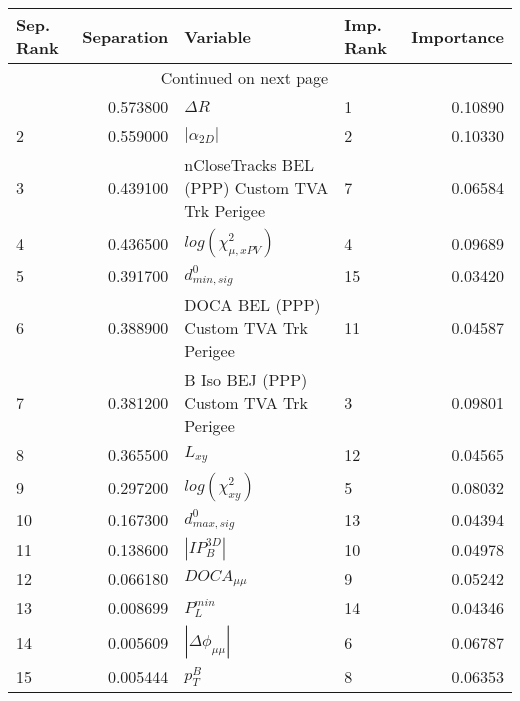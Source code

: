 \usepackage{lscape}

\begin{landscape}
\begin{longtable}{lrllr}
\toprule
Sep. Rank &  Separation &                                       Variable & Imp. Rank &  Importance \\
\midrule
\endhead
\midrule
\multicolumn{3}{r}{{Continued on next page}} \\
\midrule
\endfoot

\bottomrule
\endlastfoot
        1 &    0.573800 &                                     $\Delta R$ &         1 &     0.10890 \\
        2 &    0.559000 &                                $|\alpha_{2D}|$ &         2 &     0.10330 \\
        3 &    0.439100 &  nCloseTracks BEL (PPP) Custom TVA Trk Perigee &         7 &     0.06584 \\
        4 &    0.436500 &                      $log(\chi^{2}_{\mu,xPV})$ &         4 &     0.09689 \\
        5 &    0.391700 &                               $d^0_{min, sig}$ &        15 &     0.03420 \\
        6 &    0.388900 &          DOCA BEL (PPP) Custom TVA Trk Perigee &        11 &     0.04587 \\
        7 &    0.381200 &         B Iso BEJ (PPP) Custom TVA Trk Perigee &         3 &     0.09801 \\
        8 &    0.365500 &                                       $L_{xy}$ &        12 &     0.04565 \\
        9 &    0.297200 &                           $log(\chi^{2}_{xy})$ &         5 &     0.08032 \\
       10 &    0.167300 &                               $d^0_{max, sig}$ &        13 &     0.04394 \\
       11 &    0.138600 &                                $|IP_{B}^{3D}|$ &        10 &     0.04978 \\
       12 &    0.066180 &                                $DOCA_{\mu\mu}$ &         9 &     0.05242 \\
       13 &    0.008699 &                                  $P^{min}_{L}$ &        14 &     0.04346 \\
       14 &    0.005609 &                       $|\Delta \phi_{\mu\mu}|$ &         6 &     0.06787 \\
       15 &    0.005444 &                                      $p^B_{T}$ &         8 &     0.06353 \\
\end{longtable}

\end{landscape}
